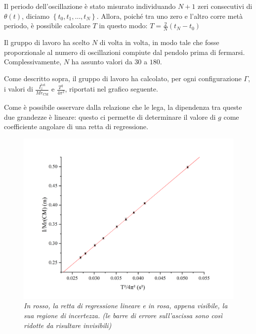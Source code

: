 \documentclass{article}
\begin{document}
\pagebreak
Il periodo dell'oscillazione è stato misurato individuando $N+1$ zeri
consecutivi di $\theta(t)$, diciamo $\left\{t_0,t_1,\dots,t_N\right\}$.
Allora, poiché tra uno zero e l'altro corre metà periodo, è possibile
calcolare $T$ in questo modo: $T = \frac{2}{N}(t_N - t_0)$

Il gruppo di lavoro ha scelto $N$ di volta in volta, in modo tale che
fosse proporzionale al numero di oscillazioni compiute dal pendolo
prima di fermarsi. Complessivamente, $N$ ha assunto valori da $30$ a
$180$.

\vspace{2mm}

Come descritto sopra, il gruppo di lavoro ha calcolato, per ogni
configurazione $\Gamma$,
i valori di $\frac{I_z^\text{tot}}{Mr_\text{CM}}$
e $\frac{T^2}{4\pi^2}$, riportati nel grafico seguente.

Come è possibile osservare dalla relazione che le lega, la dipendenza
tra queste due grandezze è lineare: questo ci permette di determinare
il valore di $g$ come coefficiente angolare di una retta di regressione.

\begin{center}
\begin{figure}[H]
  \includegraphics[trim={2cm 1cm 2cm 2.1cm},clip,width=\textwidth]{img/regressione.png}
  \caption[]{\emph{
    In rosso, la retta di regressione lineare e in rosa,
    appena visibile, la sua regione di incertezza.
    (le barre di errore sull'ascissa sono così ridotte
    da risultare invisibili)
  }}
\end{figure}
\end{center}
\end{document}
